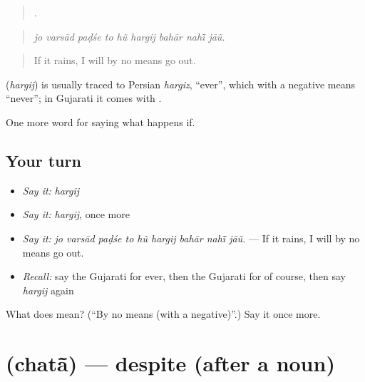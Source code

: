 \begin{quote}
        .
\end{quote}

\begin{quote}
\emph{jo varsād paḍśe to hũ hargij bahār nahī̃ jāũ.}
\end{quote}

\begin{quote}
If it rains, I will by no means go out.
\end{quote}

\begin{cousinweb}
\textbf{} (\emph{hargij}) is usually traced to Persian \emph{hargiz}, \textquotedblleft{}ever\textquotedblright{}, which with a negative means \textquotedblleft{}never\textquotedblright{}; in Gujarati it comes with \textbf{}.
\end{cousinweb}

\begin{grammarlens}[title={What you've built}]
One more word for saying what happens if.
\end{grammarlens}

\subsection*{Your turn}
\begin{itemize}
\raggedright
  \item \emph{Say it:} \emph{hargij}
  \item \emph{Say it:} \emph{hargij}, once more
  \item \emph{Say it:} \emph{jo varsād paḍśe to hũ hargij bahār nahī̃ jāũ.} — If it rains, I will by no means go out.
  \item \emph{Recall:} say the Gujarati for ever, then the Gujarati for of course, then say \emph{hargij} again
\end{itemize}

\begin{tcolorbox}[breakable,colback=teal!4,colframe=teal!35!black,title={Before you move on}]
What does  mean? (\textquotedblleft{}By no means (with a negative)\textquotedblright{}.) Say it once more.
\end{tcolorbox}
\section[\texorpdfstring{\gu{છતાં} (chatā̃)}{છતાં (chatā̃)}]{ (chatā̃) — despite (after a noun)}

